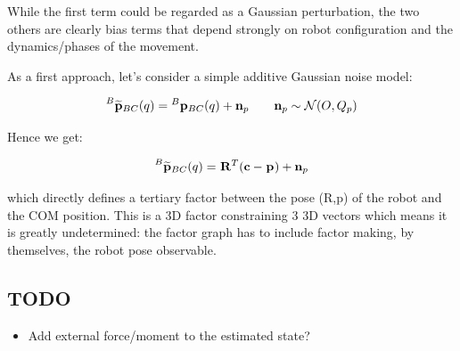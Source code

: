 \documentclass[11pt]{article}
\newcommand{\Rot}[2]{\prescript{#1}{}{\bfR}_{#2}}
\newcommand{\noise}{\bfn}
\newcommand{\posi}[2]{\prescript{#1}{}{\bfp}_{#2}}
\newcommand{\posim}[2]{\prescript{#1}{}{\widetilde{\bfp}}_{#2}}
\newcommand{\COM}{\bfc}
\newcommand{\Gaussian}[2]{\mathcal{N}({#1},{#2})}
\begin{document}
While the first term could be regarded as a Gaussian perturbation, the two others are clearly bias terms that depend strongly on robot configuration and the dynamics/phases of the movement.  

As a first approach, let's consider a simple additive Gaussian noise model:

\begin{equation}
    \posim{B}{BC}(q) = \posi{B}{BC}(q) + \noise_p ~~~~~~ \noise_p \sim \Gaussian{O}{Q_p}
\end{equation}

Hence we get:

\begin{equation}
    \posim{B}{BC}(q) = \Rot{}{}^T(\COM - \posi{}{}) + \noise_p
\end{equation}

which directly defines a tertiary factor between the pose (R,p) of the robot and the COM position. This is a 3D factor constraining 3 3D vectors which means it is greatly undetermined: the factor graph has to include factor making, by themselves, the robot pose observable.



\subsection{TODO}
\begin{itemize}
    \item Add external force/moment to the estimated state? 
\end{itemize}
\end{document}
